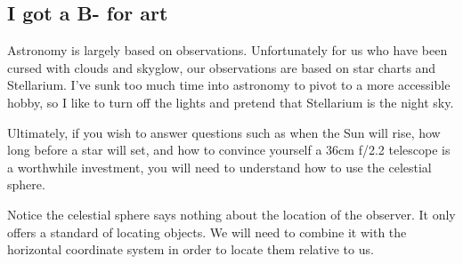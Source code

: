 \documentclass{article}
\begin{document}
\subsection{I got a B- for art}
Astronomy is largely based on observations. Unfortunately for us who have been cursed with clouds and skyglow, our observations are based on star charts and Stellarium. I've sunk too much time into astronomy to pivot to a more accessible hobby, so I like to turn off the lights and pretend that Stellarium is the night sky.

Ultimately, if you wish to answer questions such as when the Sun will rise, how long before a star will set, and how to convince yourself a 36cm f/2.2 telescope is a worthwhile investment, you will need to understand how to use the celestial sphere.

Notice the celestial sphere says nothing about the location of the observer. It only offers a standard of locating objects. We will need to combine it with the horizontal coordinate system in order to locate them relative to us.
\end{document}
